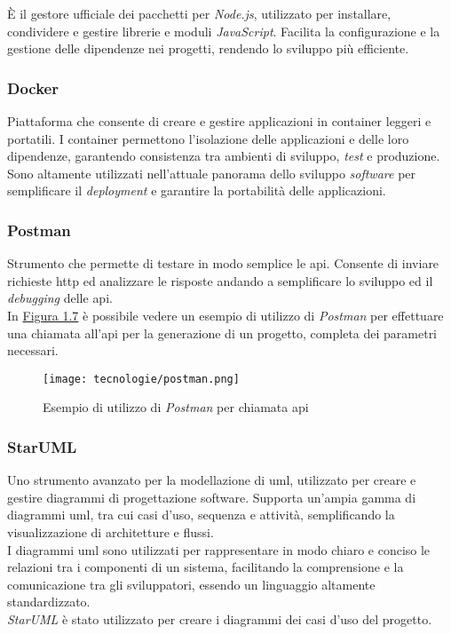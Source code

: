 È il gestore ufficiale dei pacchetti per \textit{Node.js}, utilizzato per installare, condividere e gestire librerie e moduli \textit{JavaScript}. 
Facilita la configurazione e la gestione delle dipendenze nei progetti, rendendo lo sviluppo più efficiente.

\subsubsection{Docker}

Piattaforma che consente di creare e gestire applicazioni in \gls{container} leggeri e portatili.
I \gls{container} permettono l’isolazione delle applicazioni e delle loro dipendenze, garantendo consistenza tra ambienti di sviluppo, \textit{test} e produzione.\\
Sono altamente utilizzati nell'attuale panorama dello sviluppo \textit{software} per semplificare il \textit{deployment} e garantire la portabilità delle applicazioni.

\subsubsection{Postman}

Strumento che permette di testare in modo semplice le \gls{api}. 
Consente di inviare richieste \gls{http} ed analizzare le risposte andando a semplificare lo sviluppo ed il \textit{debugging} delle \gls{api}. \\
In {\hyperref[fig:postman]{Figura 1.7}} è possibile vedere un esempio di utilizzo di \textit{Postman} per effettuare una chiamata all'\gls{api} per
la generazione di un progetto, completa dei parametri necessari.

\begin{figure}[H]
    \label{fig:postman}
    \centering
    \texttt{[image: tecnologie/postman.png]}
    \caption{Esempio di utilizzo di \textit{Postman} per chiamata \gls{api}}
\end{figure}

\subsubsection{StarUML}

Uno strumento avanzato per la modellazione di \gls{uml}, utilizzato per creare e gestire diagrammi di progettazione software. Supporta un'ampia gamma di diagrammi \gls{uml}, tra cui casi d'uso, sequenza e attività, semplificando la visualizzazione di architetture e flussi.\\
I diagrammi \gls{uml} sono utilizzati per rappresentare in modo chiaro e conciso le relazioni tra i componenti di un sistema, facilitando la comprensione e la comunicazione tra gli sviluppatori, essendo un linguaggio altamente standardizzato.\\
\textit{StarUML} è stato utilizzato per creare i diagrammi dei casi d’uso del progetto.

